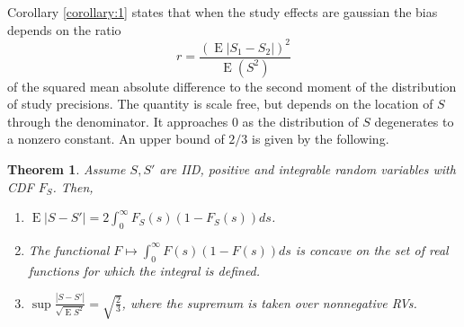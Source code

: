 \documentclass[12pt]{article}
\renewcommand{\P}{P}
\newcommand{\biasratio}{r}%
\newtheorem{theorem}{Theorem}
\newcommand{\s}{S}
\newcommand{\x}{X}
\DeclareMathOperator{\E}{E}
\begin{document}

  
  Corollary \ref{corollary:1} states that when the study effects are gaussian the bias depends on the ratio
  $$
  \biasratio=\frac{(\E|\s_1-\s_2|)^2}{\E(\s^2)}
  $$
  of the squared mean absolute difference to the second moment of the
  distribution of study precisions. The quantity is scale free, but
  depends on the location of $\s$ through the denominator. It
  approaches $0$ as the distribution of $\s$ degenerates to a nonzero
  constant. %
  An upper bound of $2/3$ is given by the following.
    \begin{theorem}\label{theorem:2}
    Assume $\s,\s'$ are IID, positive and integrable random variables with CDF $F_\s$. Then,
    \begin{enumerate}
    \item $\E |\s - \s'| = 2\int_0^\infty F_\s(s)(1-F_\s(s))ds$.
    \item The functional $F \mapsto \int_0^\infty F(s)(1-F(s))ds$ is concave on the set of real functions for which the integral is defined. %
    \item $\sup\frac{|\s-\s'|}{\sqrt{\E\s^2}}=\sqrt{\frac{2}{3}}$, where the supremum is taken over nonnegative RVs.
    \end{enumerate}
  \end{theorem}
\end{document}
